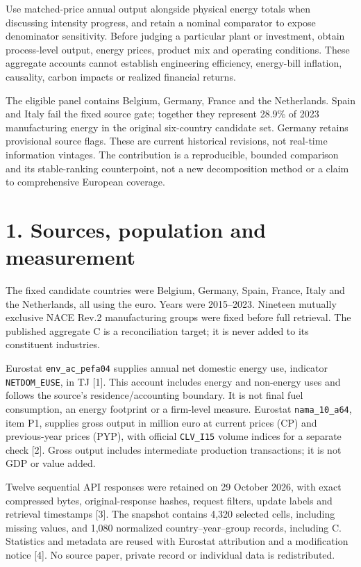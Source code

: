 \documentclass[11pt,letterpaper]{article}
\begin{document}
Use matched-price annual output alongside physical energy totals when discussing intensity progress, and retain a nominal comparator to expose denominator sensitivity. Before judging a particular plant or investment, obtain process-level output, energy prices, product mix and operating conditions. These aggregate accounts cannot establish engineering efficiency, energy-bill inflation, causality, carbon impacts or realized financial returns.

The eligible panel contains Belgium, Germany, France and the Netherlands. Spain and Italy fail the fixed source gate; together they represent 28.9\% of 2023 manufacturing energy in the original six-country candidate set. Germany retains provisional source flags. These are current historical revisions, not real-time information vintages. The contribution is a reproducible, bounded comparison and its stable-ranking counterpoint, not a new decomposition method or a claim to comprehensive European coverage.

\newpage
\section*{1. Sources, population and measurement}
The fixed candidate countries were Belgium, Germany, Spain, France, Italy and the Netherlands, all using the euro. Years were 2015--2023. Nineteen mutually exclusive NACE Rev.2 manufacturing groups were fixed before full retrieval. The published aggregate C is a reconciliation target; it is never added to its constituent industries.

Eurostat \texttt{env\_ac\_pefa04} supplies annual net domestic energy use, indicator \texttt{NETDOM\_EUSE}, in TJ [1]. This account includes energy and non-energy uses and follows the source's residence/accounting boundary. It is not final fuel consumption, an energy footprint or a firm-level measure. Eurostat \texttt{nama\_10\_a64}, item P1, supplies gross output in million euro at current prices (CP) and previous-year prices (PYP), with official \texttt{CLV\_I15} volume indices for a separate check [2]. Gross output includes intermediate production transactions; it is not GDP or value added.

Twelve sequential API responses were retained on 29 October 2026, with exact compressed bytes, original-response hashes, request filters, update labels and retrieval timestamps [3]. The snapshot contains 4,320 selected cells, including missing values, and 1,080 normalized country--year--group records, including C. Statistics and metadata are reused with Eurostat attribution and a modification notice [4]. No source paper, private record or individual data is redistributed.
\end{document}
